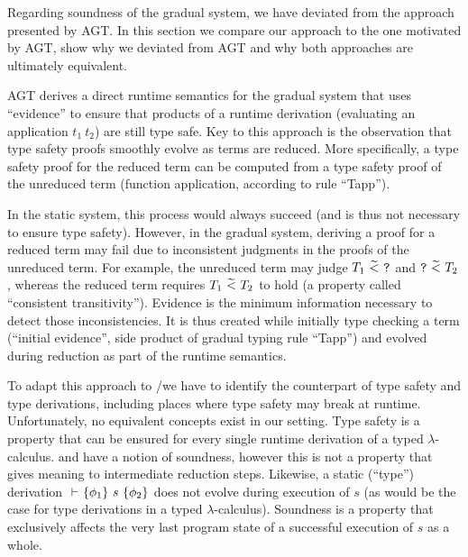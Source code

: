 Regarding soundness of the gradual system, we have deviated from the approach presented by AGT.
In this section we compare our approach to the one motivated by AGT, show why we deviated from AGT and why both approaches are ultimately equivalent.

AGT derives a direct runtime semantics for the gradual system that uses “evidence” to ensure that products of a runtime derivation (evaluating an application $t_1~t_2$) are still type safe.
Key to this approach is the observation that type safety proofs smoothly evolve as terms are reduced.
More specifically, a type safety proof for the reduced term can be computed from a type safety proof of the unreduced term (function application, according to rule “Tapp”).

In the static system, this process would always succeed (and is thus not necessary to ensure type safety).
However, in the gradual system, deriving a proof for a reduced term may fail due to inconsistent judgments in the proofs of the unreduced term.
For example, the unreduced term may judge $T_1~\widetilde{<}~\textup{\texttt{?}}$ and $\textup{\texttt{?}}~\widetilde{<}~T_2$, whereas the reduced term requires $T_1~\widetilde{<}~T_2$ to hold (a property called “consistent transitivity”).
Evidence is the minimum information necessary to detect those inconsistencies.
It is thus created while initially type checking a term (“initial evidence”, side product of gradual typing rule “\gradT Tapp”) and evolved during reduction as part of the runtime semantics.


\begin{comment}{Combining Proofs}~\\
    Given proofs for type judgments $\Gamma \vdash t_1 : T_1$ and $\Gamma \vdash t_2 : T_2$, one may derive a proof for $\Gamma \vdash t_1~t_2 : \predicate{cod}(T_1)$.
    
    In the static system, this proof must exist since $\Gamma \vdash t_1~t_2 : \predicate{cod}(T_1)$ would have been proven before 
\end{comment}

To adapt this approach to \svl/\gvl we have to identify the counterpart of type safety and type derivations, including places where type safety may break at runtime.
Unfortunately, no equivalent concepts exist in our setting.
Type safety is a property that can be ensured for every single runtime derivation of a typed $\lambda$-calculus.
\svl and \gvl have a notion of soundness, however this is not a property that gives meaning to intermediate reduction steps.
Likewise, a static (“type”) derivation ${} \,\,{\vdash}\,\, \{{\phi_1}\} ~{s}~ \{{\phi_2}\}$ does not evolve during execution of $s$ (as would be the case for type derivations in a typed $\lambda$-calculus).
Soundness is a property that exclusively affects the very last program state of a successful execution of $s$ as a whole.

